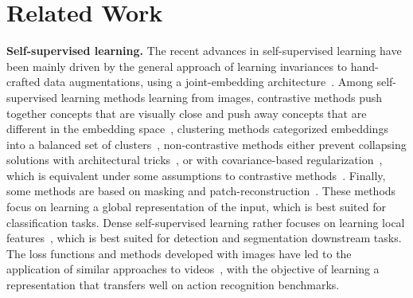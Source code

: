 \documentclass{article} %
\newcommand{\parspace}{\vspace{0mm}}
\begin{document}
\section{Related Work}

\noindent \textbf{Self-supervised learning.} The recent advances in self-supervised learning have been mainly driven by the general approach of learning invariances to hand-crafted data augmentations, using a joint-embedding architecture~\citep{lecun2022jepa}. Among self-supervised learning methods learning from images, contrastive methods push together concepts that are visually close and push away concepts that are different in the embedding space~\citep{hjelm2019mutual, chen2020simclr, he2020moco, chen2020mocov2, mitrovic2021relic, dwibedi2021nnclr, chen2021mocov3, tomasev2022relicv2, li2022esvit}, clustering methods categorized embeddings into a balanced set of clusters~\citep{caron2018clustering, caron2020swav, caron2021dino}, non-contrastive methods either prevent collapsing solutions with architectural tricks~\citep{grill2020byol, lee2021cbyol, chen2020simsiam}, or with covariance-based regularization~\citep{ermolov2021whitening, zbontar2021barlow, bardes2022vicreg, garrido2023sie}, which is equivalent under some assumptions to contrastive methods~\citep{garrido2022duality}. Finally, some methods are based on masking and patch-reconstruction~\citep{bao2022beit, he2022mae, zhou2022ibot, assran2022msn, assran2023ijepa}. These methods focus on learning a global representation of the input, which is best suited for classification tasks. Dense self-supervised learning rather focuses on learning local features~\citep{xie2021pixpro, wang2021densecl, xiao2021resim, yang2021insloc, wang2022cp2, yang2022inscon, henaff2021detcon, henaff2022odin, chen2022intrainstance, caron2023loca}, which is best suited for detection and segmentation downstream tasks. The loss functions and methods developed with images have led to the application of similar approaches to videos~\citep{qian2021cvrl, recasens2021brave, feichtenhofer2021rbyol, tong2022videomae, parthasarathy2022vito}, with the objective of learning a representation that transfers well on action recognition benchmarks.
\parspace
\end{document}
